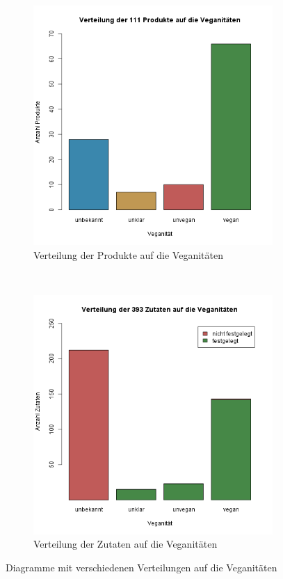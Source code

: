 \begin{figure}[ht]
	\begin{adjustwidth}{-1in}{-1in}
	\centering
	\begin{subfigure}[b]{0.6\textwidth}
		\includegraphics[width=\textwidth]{misc/r/products.png}
		\caption{Verteilung der Produkte auf die Veganitäten}
		\label{img:products}
	\end{subfigure}
	~
	\begin{subfigure}[b]{0.6\textwidth}
		\includegraphics[width=\textwidth]{misc/r/ingredients-f.png}
		\caption{Verteilung der Zutaten auf die Veganitäten}
		\label{img:ingredients}
	\end{subfigure}
	\end{adjustwidth}
	\caption{Diagramme mit verschiedenen Verteilungen auf die Veganitäten} 
	\label{img:evaluation-1}
\end{figure}

